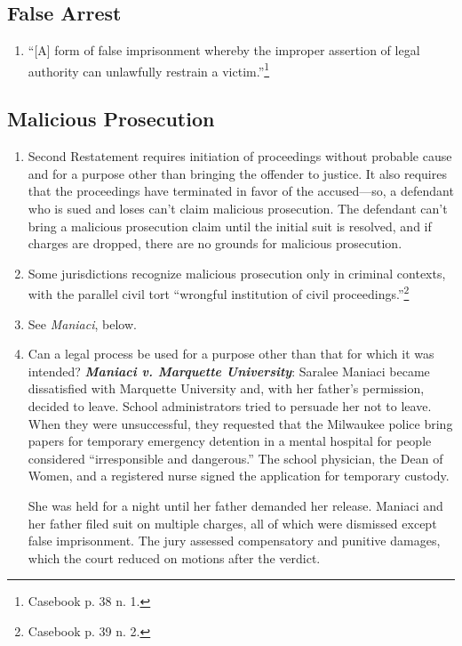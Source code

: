 \subsection{False Arrest}

\begin{enumerate}
    \item ``[A] form of false imprisonment whereby the improper assertion of legal authority can unlawfully restrain a victim.''\footnote{Casebook p. 38 n. 1.}
\end{enumerate}

\subsection{Malicious Prosecution}
\begin{enumerate}
    \item Second Restatement requires initiation of proceedings without probable cause and for a purpose other than bringing the offender to justice. It also requires that the proceedings have terminated in favor of the accused---so, a defendant who is sued and loses can't claim malicious prosecution. The defendant can't bring a malicious prosecution claim until the initial suit is resolved, and if charges are dropped, there are no grounds for malicious prosecution.
    \item Some jurisdictions recognize malicious prosecution only in criminal contexts, with the parallel civil tort ``wrongful institution of civil proceedings.''\footnote{Casebook p. 39 n. 2.}
    \item See \emph{Maniaci}, below.
    \item Can a legal process be used for a purpose other than that for which it was intended? \textbf{\emph{Maniaci v. Marquette University}}: Saralee Maniaci became dissatisfied with Marquette University and, with her father's permission, decided to leave. School administrators tried to persuade her not to leave. When they were unsuccessful, they requested that the Milwaukee police bring papers for temporary emergency detention in a mental hospital for people considered ``irresponsible and dangerous.'' The school physician, the Dean of Women, and a registered nurse signed the application for temporary custody.

She was held for a night until her father demanded her release. Maniaci and her father filed suit on multiple charges, all of which were dismissed except false imprisonment. The jury assessed compensatory and punitive damages, which the court reduced on motions after the verdict.


\end{enumerate}
